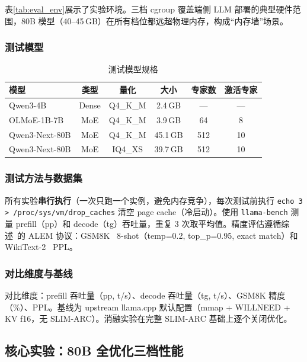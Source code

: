 表\ref{tab:eval_env}展示了实验环境。三档 cgroup 覆盖端侧 LLM 部署的典型硬件范围，80B 模型（40--45\,GB）在所有档位都远超物理内存，构成“内存墙”场景。

\subsubsection{测试模型}

\begin{table}[H]
    \centering
    \caption{测试模型规格}
    \label{tab:eval_models}
    \begin{tabular}{lccccc}
        \toprule
        \textbf{模型} & \textbf{类型} & \textbf{量化} & \textbf{大小} & \textbf{专家数} & \textbf{激活专家} \\
        \midrule
        Qwen3-4B & Dense & Q4\_K\_M & 2.4\,GB & --- & --- \\
        OLMoE-1B-7B & MoE & Q4\_K\_M & 3.9\,GB & 64 & 8 \\
        Qwen3-Next-80B & MoE & Q4\_K\_M & 45.1\,GB & 512 & 10 \\
        Qwen3-Next-80B & MoE & IQ4\_XS & 39.7\,GB & 512 & 10 \\
        \bottomrule
    \end{tabular}
\end{table}

\subsubsection{测试方法与数据集}

所有实验\textbf{串行执行}（一次只跑一个实例，避免内存竞争），每次测试前执行 \texttt{echo 3 > /proc/sys/vm/drop\_caches} 清空 page cache（冷启动）。使用 \texttt{llama-bench} 测量 prefill（pp）和 decode（tg）吞吐量，重复 3 次取平均值。精度评估遵循综述~\cite{survey2026}的 ALEM 协议：GSM8K~\cite{gsm8k2021} 8-shot（temp=0.2, top\_p=0.95, exact match）和 WikiText-2~\cite{wikitext2016} PPL。

\subsubsection{对比维度与基线}

对比维度：prefill 吞吐量（pp, t/s）、decode 吞吐量（tg, t/s）、GSM8K 精度（\%）、PPL。基线为 upstream llama.cpp 默认配置（mmap + WILLNEED + KV f16，无 SLIM-ARC）。消融实验在完整 SLIM-ARC 基础上逐个关闭优化。

\subsection{核心实验：80B 全优化三档性能}

